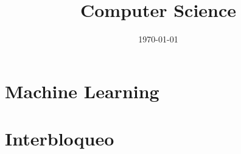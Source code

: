 \documentclass{book}
\title{Computer Science}
\author{}
\date{\today}
\begin{document}
\maketitle

\tableofcontents

\listofalgorithms{}

\chapter{Machine Learning}


\chapter{Interbloqueo}

\end{document}

